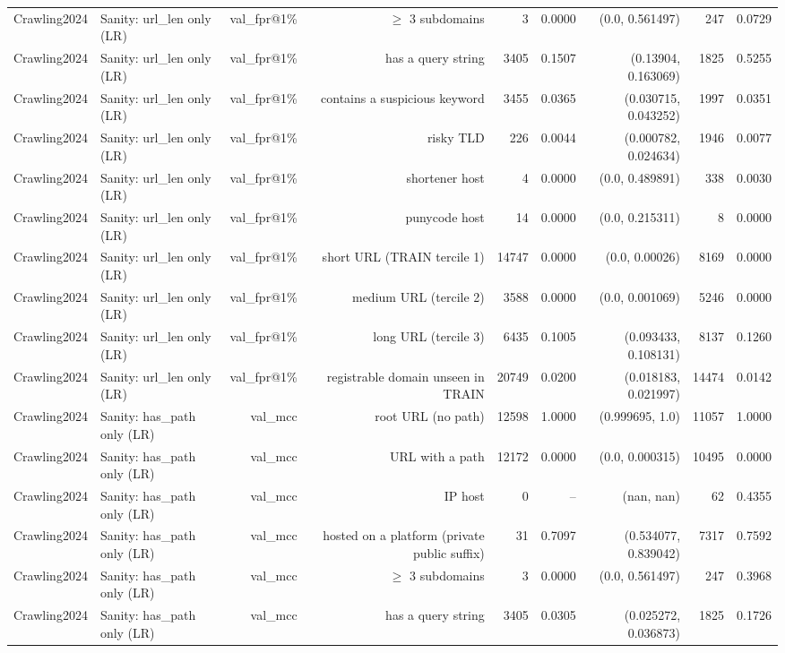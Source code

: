 \begin{table}[t]
\begin{tabular}{llrrrrrrr}
Crawling2024 & Sanity: url\_len only (LR) & val\_fpr@1\% & $\geq$ 3 subdomains & 3 & 0.0000 & (0.0, 0.561497) & 247 & 0.0729 \\
Crawling2024 & Sanity: url\_len only (LR) & val\_fpr@1\% & has a query string & 3405 & 0.1507 & (0.13904, 0.163069) & 1825 & 0.5255 \\
Crawling2024 & Sanity: url\_len only (LR) & val\_fpr@1\% & contains a suspicious keyword & 3455 & 0.0365 & (0.030715, 0.043252) & 1997 & 0.0351 \\
Crawling2024 & Sanity: url\_len only (LR) & val\_fpr@1\% & risky TLD & 226 & 0.0044 & (0.000782, 0.024634) & 1946 & 0.0077 \\
Crawling2024 & Sanity: url\_len only (LR) & val\_fpr@1\% & shortener host & 4 & 0.0000 & (0.0, 0.489891) & 338 & 0.0030 \\
Crawling2024 & Sanity: url\_len only (LR) & val\_fpr@1\% & punycode host & 14 & 0.0000 & (0.0, 0.215311) & 8 & 0.0000 \\
Crawling2024 & Sanity: url\_len only (LR) & val\_fpr@1\% & short URL (TRAIN tercile 1) & 14747 & 0.0000 & (0.0, 0.00026) & 8169 & 0.0000 \\
Crawling2024 & Sanity: url\_len only (LR) & val\_fpr@1\% & medium URL (tercile 2) & 3588 & 0.0000 & (0.0, 0.001069) & 5246 & 0.0000 \\
Crawling2024 & Sanity: url\_len only (LR) & val\_fpr@1\% & long URL (tercile 3) & 6435 & 0.1005 & (0.093433, 0.108131) & 8137 & 0.1260 \\
Crawling2024 & Sanity: url\_len only (LR) & val\_fpr@1\% & registrable domain unseen in TRAIN & 20749 & 0.0200 & (0.018183, 0.021997) & 14474 & 0.0142 \\
Crawling2024 & Sanity: has\_path only (LR) & val\_mcc & root URL (no path) & 12598 & 1.0000 & (0.999695, 1.0) & 11057 & 1.0000 \\
Crawling2024 & Sanity: has\_path only (LR) & val\_mcc & URL with a path & 12172 & 0.0000 & (0.0, 0.000315) & 10495 & 0.0000 \\
Crawling2024 & Sanity: has\_path only (LR) & val\_mcc & IP host & 0 & -- & (nan, nan) & 62 & 0.4355 \\
Crawling2024 & Sanity: has\_path only (LR) & val\_mcc & hosted on a platform (private public suffix) & 31 & 0.7097 & (0.534077, 0.839042) & 7317 & 0.7592 \\
Crawling2024 & Sanity: has\_path only (LR) & val\_mcc & $\geq$ 3 subdomains & 3 & 0.0000 & (0.0, 0.561497) & 247 & 0.3968 \\
Crawling2024 & Sanity: has\_path only (LR) & val\_mcc & has a query string & 3405 & 0.0305 & (0.025272, 0.036873) & 1825 & 0.1726 \\

\end{tabular}
\end{table}
